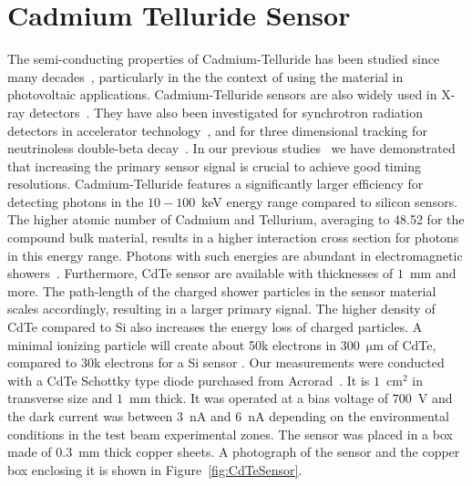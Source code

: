 %
%
%
\section{Cadmium Telluride Sensor}
\label{sec:siliconpad}
The semi-conducting properties of Cadmium-Telluride has been studied since many decades~\cite{cdtegeneric}, 
particularly in the the context of using the material in photovoltaic applications.
Cadmium-Telluride sensors are also widely used in X-ray detectors~\cite{cdtesensorsgeneric,cdtesensors2,cdtesensors3}. 
They have also been investigated for synchrotron radiation detectors in accelerator 
technology~\cite{cdtelhc}, and for three dimensional tracking for neutrinoless 
double-beta decay~\cite{Filipenko:2014zta}. In our previous 
studies~\cite{Anderson:2015gha,MCPShowerMaxPaper,Ronzhin201552,SiliconTiming,PixelatedMCP,Anderson:2016ygg,Anderson:2015tia} 
we have demonstrated that increasing the primary sensor signal is crucial to achieve good timing resolutions.  
Cadmium-Telluride features a significantly larger efficiency for detecting photons in the $10-100$~keV energy range 
compared to silicon sensors. The higher atomic number of Cadmium and Tellurium, averaging to 48.52 for the 
compound bulk material, results in a higher interaction cross section for photons in this energy range. 
Photons with such energies are abundant in electromagnetic showers~\cite{showercomposition}. 
Furthermore, CdTe sensor are available with thicknesses of $1$~mm and more. 
The path-length of the charged shower particles in the sensor material scales accordingly, 
resulting in a larger primary signal. The higher density of CdTe compared to Si also increases the energy loss of charged particles. A minimal ionizing particle will create about 50k electrons in 300~$\mathrm{\mu}$m of CdTe, compared to 30k electrons for a Si sensor \cite{cdtelhc2}.
%
Our measurements were conducted with a CdTe Schottky type diode purchased from 
Acrorad~\cite{acrorad}. It is $1$~$\mathrm{cm}^{2}$ in transverse size and $1$~mm thick.
It was operated at a bias voltage of $700$~V and the dark current was between $3$~nA 
and $6$~nA depending on the environmental conditions in the test beam experimental 
zones. The sensor was placed in a box made of $0.3$~mm thick copper sheets. A 
photograph of the sensor and the copper box enclosing it is shown in 
Figure~\ref{fig:CdTeSensor}.

